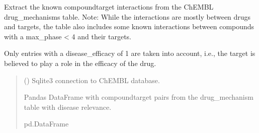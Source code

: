 \documentclass[letterpaper,10pt,english]{sphinxmanual}
\begin{document}
\begin{fulllineitems}
\label{\detokenize{get_drug_mechanism_ct_pairs:get_drug_mechanism_ct_pairs.get_drug_mechanisms_interactions}}
\pysigstartsignatures
{}
\pysigstopsignatures
\sphinxAtStartPar
Extract the known compound\sphinxhyphen{}target interactions from the ChEMBL drug\_mechanisms table.
Note: While the interactions are mostly between drugs and targets,
the table also includes some known interactions between compounds with a max\_phase \textless{} 4 and their targets.

\sphinxAtStartPar
Only entries with a disease\_efficacy of 1 are taken into account,
i.e., the target is believed to play a role in the efficacy of the drug.

\sphinxAtStartPar
{}
\begin{quote}\begin{description}
\sphinxAtStartPar
{} () \textendash{} Sqlite3 connection to ChEMBL database.

\sphinxAtStartPar
Pandas DataFrame with compound\sphinxhyphen{}target pairs from the drug\_mechanism table with disease relevance.

\sphinxAtStartPar
pd.DataFrame

\end{description}\end{quote}

\end{fulllineitems}

\end{document}
